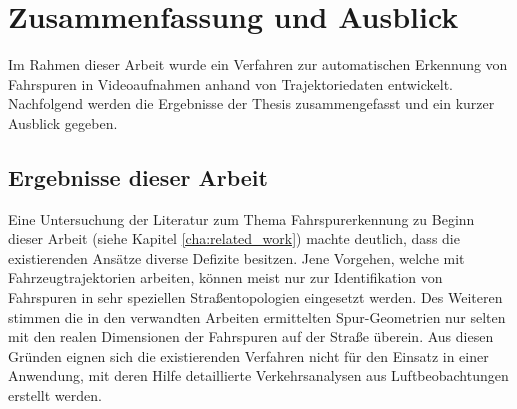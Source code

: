 
\chapter{Zusammenfassung und Ausblick}
\label{cha:end}

Im Rahmen dieser Arbeit wurde ein Verfahren zur automatischen Erkennung von Fahrspuren in Videoaufnahmen
anhand von Trajektoriedaten entwickelt.
Nachfolgend werden die Ergebnisse der Thesis zusammengefasst und ein kurzer Ausblick gegeben.

\section{Ergebnisse dieser Arbeit}



Eine Untersuchung der Literatur zum Thema Fahrspurerkennung zu Beginn dieser Arbeit
(siehe Kapitel \ref{cha:related_work}) machte deutlich, dass die existierenden Ansätze diverse
Defizite besitzen.
Jene Vorgehen, welche mit Fahrzeugtrajektorien arbeiten, können meist nur zur Identifikation von Fahrspuren
in sehr speziellen Straßentopologien eingesetzt werden.
Des Weiteren stimmen die in den verwandten Arbeiten ermittelten Spur-Geometrien nur selten mit den realen Dimensionen
der Fahrspuren auf der Straße überein.
Aus diesen Gründen eignen sich die existierenden Verfahren nicht für den Einsatz in einer
Anwendung, mit deren Hilfe detaillierte Verkehrsanalysen aus Luftbeobachtungen erstellt werden.

